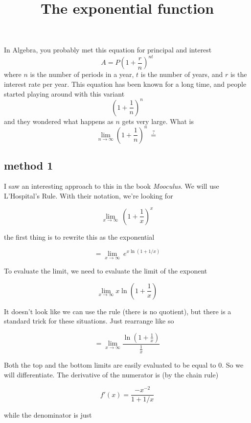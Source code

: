\documentclass[11pt, oneside]{article}   	%
\title{The exponential function}
\date{}							%
\begin{document}
\maketitle
\large
In Algebra, you probably met this equation for principal and interest
\[ A = P (1 + \frac{r}{n})^{nt} \]
where $n$ is the number of periods in a year, $t$ is the number of years, and $r$ is the interest rate per year.  This equation has been known for a long time, and people started playing around with this variant
\[ (1 + \frac{1}{n})^{n} \]
and they wondered what happens as $n$ gets very large.  What is
\[ \lim_{n \to \infty} (1 + \frac{1}{n})^{n} \ \stackrel{?}{=} \]

\subsection*{method 1}

I saw an interesting approach to this in the book \emph{Mooculus}.  We will use L'Hospital's Rule.  With their notation, we're looking for

\[ \lim_{x \rightarrow \infty} \ (1 + \frac{1}{x})^x \]

the first thing is to rewrite this as the exponential

\[ = \lim_{x \rightarrow \infty} \ e^{x \ln(1 + 1/x)} \]

To evaluate the limit, we need to evaluate the limit of the exponent

\[ \lim_{x \rightarrow \infty} x   \ln (1 + \frac{1}{x})  \]

It doesn't look like we can use the rule (there is no quotient), but there is a standard trick for these situations.  Just rearrange like so

\[ = \lim_{x \rightarrow \infty} \frac{ \ln (1 + \frac{1}{x})}{\frac{1}{x}}  \]

Both the top and the bottom limits are easily evaluated to be equal to $0$.  So we will differentiate.  The derivative of the numerator is (by the chain rule)

\[ f'(x) = \frac{-x^{-2}}{1 + 1/x} \]

while the denominator is just
\end{document}
